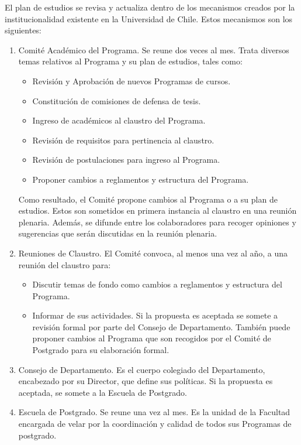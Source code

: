El plan de estudios se revisa y actualiza dentro de los mecanismos creados por la institucionalidad
existente en la Universidad de Chile. Estos mecanismos son los siguientes:

\begin{enumerate}
\item Comité Académico del Programa. Se reune dos veces al mes. Trata diversos temas relativos
al Programa y su plan de estudios, tales como:

\begin{itemize}
\item Revisión y Aprobación de nuevos Programas de cursos.
\item Constitución de comisiones de defensa de tesis.
\item Ingreso de académicos al claustro del Programa.
\item Revisión de requisitos para pertinencia al claustro.
\item Revisión de postulaciones para ingreso al Programa.
\item Proponer cambios a reglamentos y estructura del Programa.
\end{itemize}

Como resultado, el Comité propone cambios al Programa o a su plan de estudios. Estos son
sometidos en primera instancia al claustro en una reunión plenaria. Además, se difunde entre 
los colaboradores para recoger opiniones y sugerencias que serán discutidas en la reunión plenaria.

\item Reuniones de Claustro. El Comité convoca, al menos una vez al año, a una reunión del
claustro para:

\begin{itemize}
\item Discutir temas de fondo como cambios a reglamentos y estructura del Programa.
\item Informar de sus actividades. Si la propuesta es aceptada se somete a revisión formal
por parte del Consejo de Departamento. También puede proponer cambios al Programa
que son recogidos por el Comité de Postgrado para su elaboración formal.
\end{itemize}

\item Consejo de Departamento. Es el cuerpo colegiado del Departamento, encabezado por su
Director, que define sus políticas. Si la propuesta es aceptada, se somete a la Escuela de
Postgrado.

\item Escuela de Postgrado. Se reune una vez al mes. Es la unidad de la Facultad encargada de
velar por la coordinación y calidad de todos sus Programas de postgrado.


\end{enumerate}
